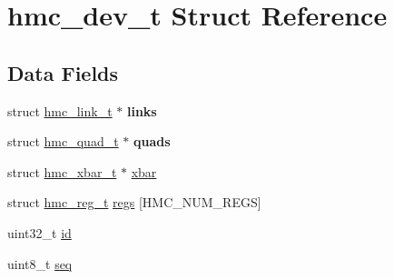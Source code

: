 \hypertarget{structhmc__dev__t}{\section{hmc\-\_\-dev\-\_\-t Struct Reference}
\label{structhmc__dev__t}
}
\subsection*{Data Fields}
\begin{DoxyCompactItemize}
\item 
\hypertarget{structhmc__dev__t_a183ff448cc1e0ec77d5549858f407c7c}{struct \hyperlink{structhmc__link__t}{hmc\-\_\-link\-\_\-t} $\ast$ {\bfseries links}}\label{structhmc__dev__t_a183ff448cc1e0ec77d5549858f407c7c}

\item 
\hypertarget{structhmc__dev__t_a17f41e431c406a9ad1047dfd089e2a0e}{struct \hyperlink{structhmc__quad__t}{hmc\-\_\-quad\-\_\-t} $\ast$ {\bfseries quads}}\label{structhmc__dev__t_a17f41e431c406a9ad1047dfd089e2a0e}

\item 
struct \hyperlink{structhmc__xbar__t}{hmc\-\_\-xbar\-\_\-t} $\ast$ \hyperlink{structhmc__dev__t_ac335689014f65c41ec89b2caeeca7a27}{xbar}
\item 
struct \hyperlink{structhmc__reg__t}{hmc\-\_\-reg\-\_\-t} \hyperlink{structhmc__dev__t_a5ce07cc42f7bb6e69fcf918354be02f1}{regs} \mbox{[}H\-M\-C\-\_\-\-N\-U\-M\-\_\-\-R\-E\-G\-S\mbox{]}
\item 
uint32\-\_\-t \hyperlink{structhmc__dev__t_a1214ed74d329186a43dfcb4d82e0c7a0}{id}
\item 
uint8\-\_\-t \hyperlink{structhmc__dev__t_aff7e17716e5d00e2d796f88e42c3793a}{seq}
\end{DoxyCompactItemize}


